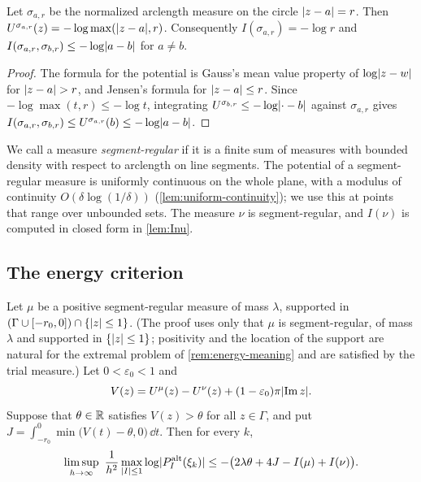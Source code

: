 \begin{lemma}[Circles]\label{lem:circles}
Let $\sigma_{a,r}$ be the normalized arclength measure on the circle $\lvert z-a\rvert=r$. Then
$U^{\sigma_{a,r}}(z)=-\log\max(\lvert z-a\rvert,r)$. Consequently $I(\sigma_{a,r})=-\log r$ and
$I(\sigma_{a,r},\sigma_{b,r})\le-\log\lvert a-b\rvert$ for $a\ne b$.
\end{lemma}

\begin{proof}
The formula for the potential is Gauss's mean value property of $\log\lvert z-w\rvert$ for
$\lvert z-a\rvert>r$, and Jensen's formula for $\lvert z-a\rvert\le r$. Since $-\log\max(t,r)\le-\log t$,
integrating $U^{\sigma_{b,r}}\le-\log\lvert \cdot-b\rvert$ against $\sigma_{a,r}$ gives
$I(\sigma_{a,r},\sigma_{b,r})\le U^{\sigma_{a,r}}(b)\le-\log\lvert a-b\rvert$.
\end{proof}

We call a measure \emph{segment-regular} if it is a finite sum of measures with bounded density
with respect to arclength on line segments. The potential of a segment-regular measure is
uniformly continuous on the whole plane, with a modulus of continuity $O(\delta\log(1/\delta))$
(\cref{lem:uniform-continuity}); we use this at points that range over unbounded sets. The
measure $\nu$ is segment-regular, and $I(\nu)$ is computed in closed form in \cref{lem:Inu}.

\subsection{The energy criterion}\label{subsec:energy-criterion}

\begin{proposition}\label{prop:energy-criterion}
Let $\mu$ be a positive segment-regular measure of mass $\lambda$, supported in
$(\Gamma\cup[-r_0,0])\cap\{\lvert z\rvert\le1\}$. (The proof uses only that $\mu$ is segment-regular, of
mass $\lambda$ and supported in $\{\lvert z\rvert\le1\}$; positivity and the location of the support are
natural for the extremal problem of \cref{rem:energy-meaning} and are satisfied by the trial
measure.) Let $0<\varepsilon_0<1$ and
\[
  V(z)=U^{\mu}(z)-U^{\nu}(z)+(1-\varepsilon_0)\pi\lvert \operatorname{Im}z\rvert.
\]
Suppose that $\theta\in\mathbb{R}$ satisfies $V(z)>\theta$ for all $z\in\Gamma$, and put
$J=\int_{-r_0}^0\min\bigl(V(t)-\theta,0\bigr)\,\dd t$. Then for every $k$,
\[
  \limsup_{h\to\infty}\ \frac1{h^2}\max_{\lvert I\rvert\le1}\log\lvert P^{\mathrm{alt}}_I(\xi_k)\rvert
  \le-\bigl(2\lambda\theta+4J-I(\mu)+I(\nu)\bigr).
\]
\end{proposition}

